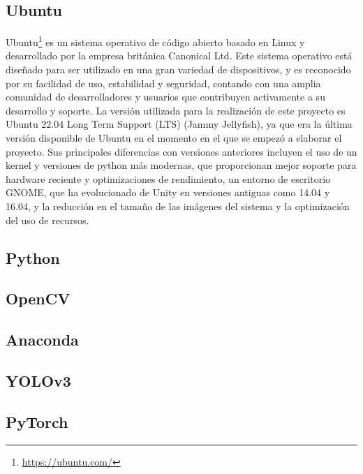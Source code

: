 \subsection{Ubuntu}
\label{sec:ubuntu}
Ubuntu\footnote{\url{https://ubuntu.com/}} es un sistema operativo de código abierto basado en Linux y desarrollado por la empresa británica Canonical Ltd. 
Este sistema operativo está diseñado para ser utilizado en una gran variedad de dispositivos, y es reconocido por su facilidad de uso, estabilidad y seguridad, contando con una amplia comunidad de desarrolladores y usuarios que contribuyen activamente a su desarrollo y soporte. La versión utilizada para la realización de este proyecto es Ubuntu 22.04 Long Term Support (LTS) (Jammy Jellyfish), ya que era la última versión disponible de Ubuntu en el momento en el que se empezó a elaborar el proyecto. Sus principales diferencias con versiones anteriores incluyen el uso de un kernel y versiones de python más modernas, que proporcionan mejor soporte para hardware reciente y optimizaciones de rendimiento, un entorno de escritorio GNOME, que ha evolucionado de Unity en versiones antiguas como 14.04 y 16.04, y  la reducción en el tamaño de las imágenes del sistema y la optimización del uso de recursos.

\subsection{Python}
\label{sec:python}

\subsection{OpenCV}
\label{sec:OpenCV}

\subsection{Anaconda}
\label{sec:Anaconda}

\subsection{YOLOv3}
\label{sec:YOLOv3}

\subsection{PyTorch}
\label{sec:PyTorch}


